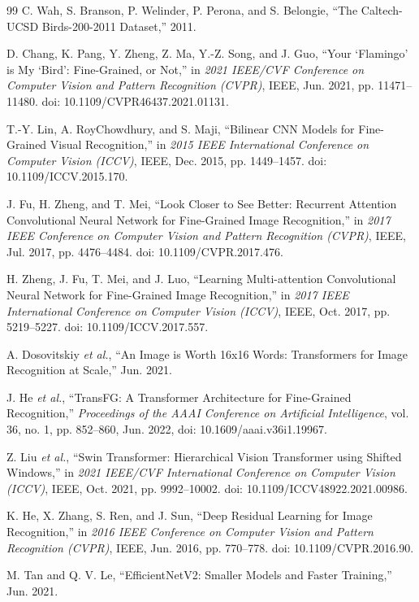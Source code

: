 \documentclass[preprint,12pt]{elsarticle}
\begin{document}
\begin{thebibliography}{99}
 C. Wah, S. Branson, P. Welinder, P. Perona, and S. Belongie,
``The Caltech-UCSD Birds-200-2011 Dataset,'' 2011.

 D. Chang, K. Pang, Y. Zheng, Z. Ma, Y.-Z. Song, and J. Guo,
``Your `Flamingo' is My `Bird': Fine-Grained, or Not,'' in \emph{2021
IEEE/CVF Conference on Computer Vision and Pattern Recognition (CVPR)},
IEEE, Jun. 2021, pp. 11471--11480. doi: 10.1109/CVPR46437.2021.01131.

 T.-Y. Lin, A. RoyChowdhury, and S. Maji, ``Bilinear CNN Models
for Fine-Grained Visual Recognition,'' in \emph{2015 IEEE International
Conference on Computer Vision (ICCV)}, IEEE, Dec. 2015, pp. 1449--1457.
doi: 10.1109/ICCV.2015.170.

 J. Fu, H. Zheng, and T. Mei, ``Look Closer to See Better:
Recurrent Attention Convolutional Neural Network for Fine-Grained Image
Recognition,'' in \emph{2017 IEEE Conference on Computer Vision and
Pattern Recognition (CVPR)}, IEEE, Jul. 2017, pp. 4476--4484. doi:
10.1109/CVPR.2017.476.

 H. Zheng, J. Fu, T. Mei, and J. Luo, ``Learning Multi-attention
Convolutional Neural Network for Fine-Grained Image Recognition,'' in
\emph{2017 IEEE International Conference on Computer Vision (ICCV)},
IEEE, Oct. 2017, pp. 5219--5227. doi: 10.1109/ICCV.2017.557.

 A. Dosovitskiy \emph{et al.}, ``An Image is Worth 16x16 Words:
Transformers for Image Recognition at Scale,'' Jun. 2021.

 J. He \emph{et al.}, ``TransFG: A Transformer Architecture for
Fine-Grained Recognition,'' \emph{Proceedings of the AAAI Conference on
Artificial Intelligence}, vol. 36, no. 1, pp. 852--860, Jun. 2022, doi:
10.1609/aaai.v36i1.19967.

 Z. Liu \emph{et al.}, ``Swin Transformer: Hierarchical Vision
Transformer using Shifted Windows,'' in \emph{2021 IEEE/CVF
International Conference on Computer Vision (ICCV)}, IEEE, Oct. 2021,
pp. 9992--10002. doi: 10.1109/ICCV48922.2021.00986.

 K. He, X. Zhang, S. Ren, and J. Sun, ``Deep Residual Learning
for Image Recognition,'' in \emph{2016 IEEE Conference on Computer
Vision and Pattern Recognition (CVPR)}, IEEE, Jun. 2016, pp. 770--778.
doi: 10.1109/CVPR.2016.90.

 M. Tan and Q. V. Le, ``EfficientNetV2: Smaller Models and
Faster Training,'' Jun. 2021.


\end{thebibliography}
\end{document}
